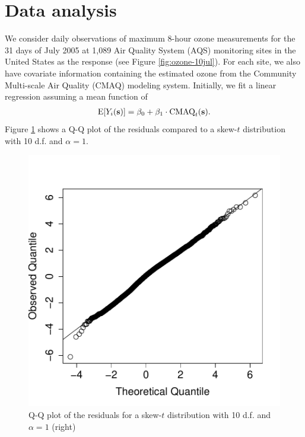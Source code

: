 \documentclass[useAMS,usenatbib,referee]{biom}
\begin{document}
\section{Data analysis}\label{s:analysis}
We consider daily observations of maximum 8-hour ozone measurements for the 31 days of July 2005 at 1,089 Air Quality System (AQS) monitoring sites in the United States as the response (see Figure \ref{fig:ozone-10jul}).
For each site, we also have covariate information containing the estimated ozone from the Community Multi-scale Air Quality (CMAQ) modeling system.
Initially, we fit a linear regression assuming a mean function of
\begin{align}
  \text{E}[Y_i(\bs)] = \beta_0 + \beta_1 \cdot \text{CMAQ}_t(\bs). \label{eq:datamean}
\end{align}
Figure \ref{fig:ozone-qq} shows a Q-Q plot of the residuals compared to a skew-$t$ distribution with 10 d.f. and $\alpha = 1$.
\begin{figure}
  \centering
  \includegraphics[width=0.5\linewidth]{plots/qq-res.pdf}
  \caption{Q-Q plot of the residuals for a skew-$t$ distribution with 10 d.f. and $\alpha = 1$ (right)}
  \label{fig:ozone-qq}
\end{figure}
\end{document}
